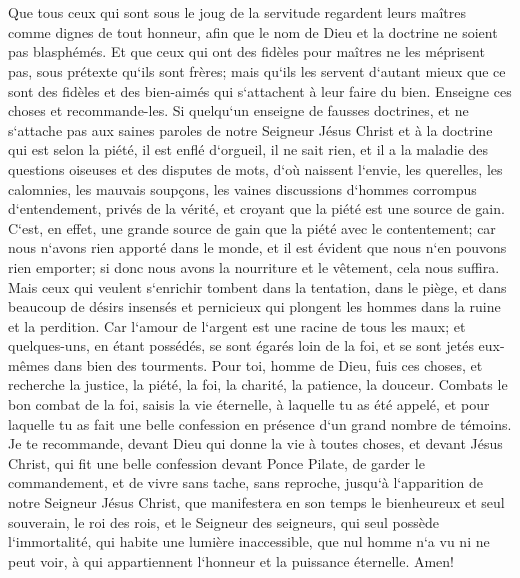 \chapter{}

\verse Que tous ceux qui sont sous le joug de la servitude regardent leurs maîtres comme dignes de tout honneur, afin que le nom de Dieu et la doctrine ne soient pas blasphémés. 
\verse Et que ceux qui ont des fidèles pour maîtres ne les méprisent pas, sous prétexte qu`ils sont frères; mais qu`ils les servent d`autant mieux que ce sont des fidèles et des bien-aimés qui s`attachent à leur faire du bien. Enseigne ces choses et recommande-les. 
\verse Si quelqu`un enseigne de fausses doctrines, et ne s`attache pas aux saines paroles de notre Seigneur Jésus Christ et à la doctrine qui est selon la piété, 
\verse il est enflé d`orgueil, il ne sait rien, et il a la maladie des questions oiseuses et des disputes de mots, d`où naissent l`envie, les querelles, les calomnies, les mauvais soupçons, 
\verse les vaines discussions d`hommes corrompus d`entendement, privés de la vérité, et croyant que la piété est une source de gain. 
\verse C`est, en effet, une grande source de gain que la piété avec le contentement; 
\verse car nous n`avons rien apporté dans le monde, et il est évident que nous n`en pouvons rien emporter; 
\verse si donc nous avons la nourriture et le vêtement, cela nous suffira. 
\verse Mais ceux qui veulent s`enrichir tombent dans la tentation, dans le piège, et dans beaucoup de désirs insensés et pernicieux qui plongent les hommes dans la ruine et la perdition. 
\verse Car l`amour de l`argent est une racine de tous les maux; et quelques-uns, en étant possédés, se sont égarés loin de la foi, et se sont jetés eux-mêmes dans bien des tourments. 
\verse Pour toi, homme de Dieu, fuis ces choses, et recherche la justice, la piété, la foi, la charité, la patience, la douceur. 
\verse Combats le bon combat de la foi, saisis la vie éternelle, à laquelle tu as été appelé, et pour laquelle tu as fait une belle confession en présence d`un grand nombre de témoins. 
\verse Je te recommande, devant Dieu qui donne la vie à toutes choses, et devant Jésus Christ, qui fit une belle confession devant Ponce Pilate, de garder le commandement, 
\verse et de vivre sans tache, sans reproche, jusqu`à l`apparition de notre Seigneur Jésus Christ, 
\verse que manifestera en son temps le bienheureux et seul souverain, le roi des rois, et le Seigneur des seigneurs, 
\verse qui seul possède l`immortalité, qui habite une lumière inaccessible, que nul homme n`a vu ni ne peut voir, à qui appartiennent l`honneur et la puissance éternelle. Amen! 
